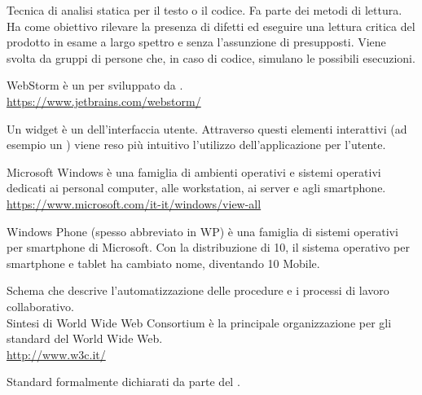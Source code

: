 Tecnica di analisi statica per il testo o il codice. Fa parte dei metodi di lettura. Ha come obiettivo rilevare la presenza di difetti ed eseguire una lettura critica del prodotto in esame a largo spettro e senza l’assunzione di presupposti. Viene svolta da gruppi di persone che, in caso di codice, simulano le possibili esecuzioni.

WebStorm è un  per  sviluppato da .\\
\url{https://www.jetbrains.com/webstorm/}

Un widget è un  dell'interfaccia utente. Attraverso questi elementi interattivi (ad esempio un ) viene reso più intuitivo l'utilizzo dell'applicazione per l'utente.

Microsoft Windows è una famiglia di ambienti operativi e sistemi operativi dedicati ai personal computer, alle workstation, ai server e agli smartphone.\\
\url{https://www.microsoft.com/it-it/windows/view-all}

Windows Phone (spesso abbreviato in WP) è una famiglia di sistemi operativi per smartphone di Microsoft. Con la distribuzione di  10, il sistema operativo per smartphone e tablet ha cambiato nome, diventando  10 Mobile.

Schema che descrive l’automatizzazione delle procedure e i processi di lavoro collaborativo.\\

Sintesi di World Wide Web Consortium è la principale organizzazione per gli standard del World Wide Web.\\
\url{http://www.w3c.it/}

Standard formalmente dichiarati da parte del .\\
\clearpage
